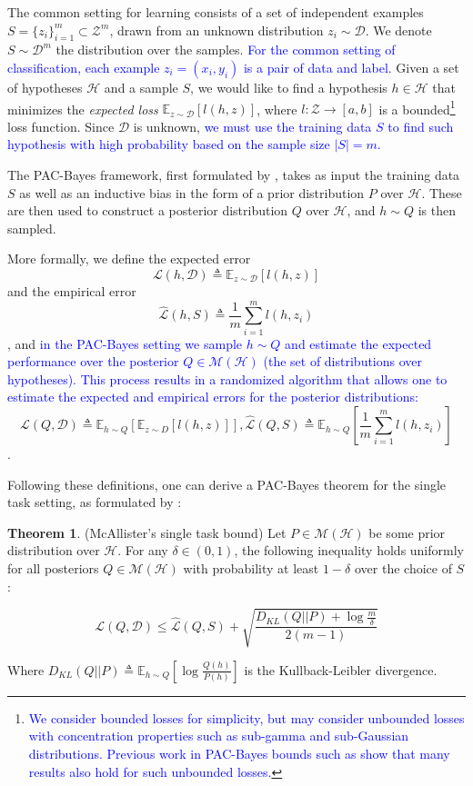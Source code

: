 \documentclass{article}
\theoremstyle{definition}
\newtheorem{theorem}{Theorem}[section]
\newcommand{\Expect}[2]{\mathbb{E}_{#1}\left [#2 \right ]}
\newcommand{\LFe}[1]{\textcolor{blue}{#1}}
\begin{document}
The common setting for learning consists of a set of independent examples $S=\{z_i\}_{i=1}^{m}\subset \mathcal{Z}^m$, drawn from an unknown distribution $z_i\sim \mathcal{D}$. We denote $S\sim \mathcal{D}^m$ the distribution over the samples. 
\LFe{For the common setting of classification, each example $z_i=(x_i,y_i)$ is a pair of data and label.}
Given a set of hypotheses $\mathcal{H}$ and a sample $S$, we would like to find a hypothesis $h\in \mathcal{H}$ that minimizes the \emph{expected loss} $\Expect{z\sim \mathcal{D}}{l(h,z)}$, where $l:\mathcal{Z}\rightarrow [a,b]$ is a bounded\footnote{\LFe{We consider bounded losses for simplicity, but may consider unbounded losses with concentration properties such as sub-gamma and sub-Gaussian distributions. Previous work in PAC-Bayes bounds such as \citet{Rothfuss2020} show that many results also hold for such unbounded losses.}} loss function.
Since $\mathcal{D}$ is unknown, \LFe{we must use the training data $S$ to find such hypothesis with high probability based on the sample size $|S|=m$.}

The PAC-Bayes framework, first formulated by \citet{Mcallester}, takes as input the training data $S$ as well as an inductive bias in the form of a prior distribution $P$ over $\mathcal{H}$. These are then used to construct a posterior distribution $Q$ over $\mathcal{H}$, and $h\sim Q$ is then sampled.

More formally, we define the expected error $$\mathcal{L}(h, \mathcal{D})\triangleq \Expect{z\sim \mathcal{D}}{l(h,z)}$$ and the empirical error $$\hat{\mathcal{L}}(h, S)\triangleq \frac{1}{m}\sum_{i=1}^{m} l(h,z_i)$$, and \LFe{in the PAC-Bayes setting we sample $h\sim Q$ and estimate the expected performance over the posterior $Q\in \mathcal{M}(\mathcal{H})$ (the set of distributions over hypotheses). This process results in a randomized algorithm that allows one to estimate the expected and empirical errors for the posterior distributions:}
$$\mathcal{L}(Q, \mathcal{D})\triangleq \Expect{h\sim Q}{\Expect{z\sim D}{l(h,z)}}, \hat{\mathcal{L}}(Q, S)\triangleq \Expect{h\sim Q}{\frac{1}{m}\sum_{i=1}^{m} l(h,z_i)}$$.

Following these definitions, one can derive a PAC-Bayes theorem for the single task setting, as formulated by \citet{Mcallester}:

\begin{theorem} (McAllister's single task bound) \label{thm:classic-pb}
	Let $P\in \mathcal{M}(\mathcal{H})$ be some prior distribution over $\mathcal{H}$.
	For any $\delta \in (0,1)$, the following inequality holds uniformly for all posteriors $Q\in \mathcal{M}(\mathcal{H})$ with probability at least $1-\delta$ over the choice of $S$:
	
	$$\mathcal{L}(Q, \mathcal{D}) \leq \hat{\mathcal{L}}(Q, S)+\sqrt{\frac{D_{KL}(Q||P)+\log\frac{m}{\delta}}{2(m-1)}}$$
	
	Where $D_{KL}(Q||P)\triangleq \Expect{h\sim Q}{\log\frac{Q(h)}{P(h)}}$ is the Kullback-Leibler divergence.
\end{theorem}
\end{document}
